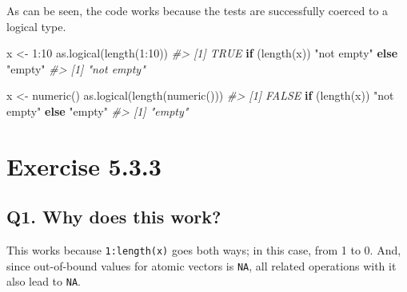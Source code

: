 \documentclass[
]{book}
\newenvironment{Shaded}{\begin{snugshade}}{\end{snugshade}}
\newcommand{\CommentTok}[1]{\textcolor[rgb]{0.56,0.35,0.01}{\textit{#1}}}
\newcommand{\ControlFlowTok}[1]{\textcolor[rgb]{0.13,0.29,0.53}{\textbf{#1}}}
\newcommand{\DecValTok}[1]{\textcolor[rgb]{0.00,0.00,0.81}{#1}}
\newcommand{\FunctionTok}[1]{\textcolor[rgb]{0.00,0.00,0.00}{#1}}
\newcommand{\NormalTok}[1]{#1}
\newcommand{\OtherTok}[1]{\textcolor[rgb]{0.56,0.35,0.01}{#1}}
\newcommand{\SpecialCharTok}[1]{\textcolor[rgb]{0.00,0.00,0.00}{#1}}
\newcommand{\StringTok}[1]{\textcolor[rgb]{0.31,0.60,0.02}{#1}}
\begin{document}
As can be seen, the code works because the tests are successfully coerced to a logical type.

\begin{Shaded}
\begin{Highlighting}[]
\NormalTok{x }\OtherTok{\textless{}{-}} \DecValTok{1}\SpecialCharTok{:}\DecValTok{10}
\FunctionTok{as.logical}\NormalTok{(}\FunctionTok{length}\NormalTok{(}\DecValTok{1}\SpecialCharTok{:}\DecValTok{10}\NormalTok{))}
\CommentTok{\#\textgreater{} [1] TRUE}
\ControlFlowTok{if}\NormalTok{ (}\FunctionTok{length}\NormalTok{(x)) }\StringTok{"not empty"} \ControlFlowTok{else} \StringTok{"empty"}
\CommentTok{\#\textgreater{} [1] "not empty"}

\NormalTok{x }\OtherTok{\textless{}{-}} \FunctionTok{numeric}\NormalTok{()}
\FunctionTok{as.logical}\NormalTok{(}\FunctionTok{length}\NormalTok{(}\FunctionTok{numeric}\NormalTok{()))}
\CommentTok{\#\textgreater{} [1] FALSE}
\ControlFlowTok{if}\NormalTok{ (}\FunctionTok{length}\NormalTok{(x)) }\StringTok{"not empty"} \ControlFlowTok{else} \StringTok{"empty"}
\CommentTok{\#\textgreater{} [1] "empty"}
\end{Highlighting}
\end{Shaded}

\hypertarget{exercise-5.3.3}{%
\section*{Exercise 5.3.3}\label{exercise-5.3.3}}

\hypertarget{q1.-why-does-this-work}{%
\subsection*{Q1. Why does this work?}\label{q1.-why-does-this-work}}

This works because \texttt{1:length(x)} goes both ways; in this case, from 1 to 0. And, since out-of-bound values for atomic vectors is \texttt{NA}, all related operations with it also lead to \texttt{NA}.
\end{document}

